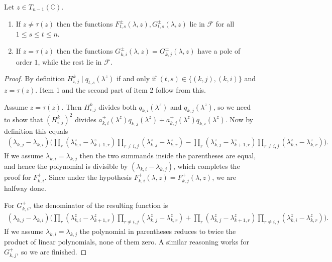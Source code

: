 \documentclass[11pt,fleqn]{article}
\newcommand\CC{\mathbb C}
\newcommand\F{\mathcal F}
\begin{document}
\begin{Lemma}
Let $z \in T_{n-1}(\CC)$.
\begin{enumerate}
\item If $z \neq \tau(z)$ then the functions 
$F^\pm_{t,s}(\lambda,z), G_{t,s}^\pm(\lambda, z)$ lie in $\F$ for all $1 
\leq s \leq t \leq n$.

\item If $z = \tau(z)$ then the functions $G_{k,i}^\pm(\lambda,z)
= G_{k,j}^\pm(\lambda,z)$ have a pole of order $1$, while the rest lie in $\F$.
\end{enumerate}
\end{Lemma}
\begin{proof}
By definition $H^k_{i,j} \mid q_{t,s}(\lambda^z)$ if and only if $(t,s) \in
\{(k,j), (k,i)\}$ and $z = \tau(z)$. Item 1 and the second part of item 2 
follow from this.

Assume $z = \tau(z)$. Then $H^k_{i,j}$ divides both $q_{k,i}(\lambda^z)$ and
$q_{k,j}(\lambda^z)$, so we need to show that $(H^k_{i,j})^2$ divides
$a^+_{k,i}(\lambda^z)q_{k,j}(\lambda^z) + a^+_{k,j}(\lambda^z)
q_{k,i}(\lambda^z)$. Now by definition this equals
\begin{align*}
(\lambda_{k,j} - \lambda _{k,i})\bigg(
	\prod_r (\lambda_{k,i}^z - \lambda_{k+1,r}^z) 
	\prod_{r \neq i,j}(\lambda_{k,j}^z - \lambda_{k,r}^z)
	- \prod_r (\lambda_{k,j}^z - \lambda_{k+1,r}^z) 
	\prod_{r \neq i,j}(\lambda_{k,i}^z - \lambda_{k,r}^z)\bigg).
\end{align*}
If we assume $\lambda_{k,i} = \lambda_{k,j}$ then the two summands inside the
parentheses are equal, and hence the polynomial is divisible by $(\lambda_{k,i}
-\lambda_{k,j})$, which completes the proof for $F_{k,i}^+$. Since under the 
hypothesis $F_{k,i}^+(\lambda,z) = F_{k,j}^+(\lambda,z)$, we are halfway done.

For $G_{k,i}^+$, the denominator of the resulting function is
\begin{align*}
(\lambda_{k,j} - \lambda _{k,i})\bigg(
	\prod_r (\lambda_{k,i}^z - \lambda_{k+1,r}^z) 
	\prod_{r \neq i,j}(\lambda_{k,j}^z - \lambda_{k,r}^z)
	+ \prod_r (\lambda_{k,j}^z - \lambda_{k+1,r}^z) 
	\prod_{r \neq i,j}(\lambda_{k,i}^z - \lambda_{k,r}^z)\bigg).
\end{align*}
If we assume $\lambda_{k,i} = \lambda_{k,j}$ the polynomial in parentheses 
reduces to twice the product of linear polynomials, none of them zero. A 
similar reasoning works for $G_{k,j}^+$, so we are finished.
\end{proof}
\end{document}
